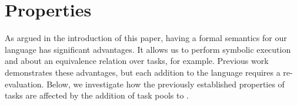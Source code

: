 \section{Properties}
\label{sec:properties}

As argued in the introduction of this paper, having a formal semantics for our \TOP language has significant advantages.
It allows us to perform symbolic execution and about an equivalence relation over tasks, for example.
Previous work demonstrates these advantages, but each addition to the language requires a re-evaluation.
Below, we investigate how the previously established properties of tasks are affected by the addition of task pools to \TOPHAT.




